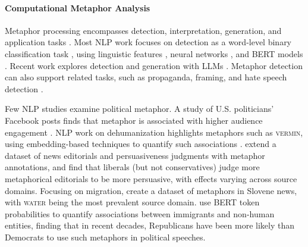 \paragraph{Computational Metaphor Analysis}

Metaphor processing encompasses detection, interpretation, generation, and application tasks \citep{shutova_models_2010,rai_survey_2020,ge_survey_2023,kohli_cracking_2023}. Most NLP work focuses on detection as a word-level binary classification task \citep{birke2006clustering,steen2010method,mohler2016introducing}, using linguistic features \citep{neuman_metaphor_2013,tsvetkov_metaphor_2014,jang_metaphor_2016}, neural networks \citep{gao_neural_2018,mao_end--end_2019,dankers_being_2020,le_multi-task_2020}, and BERT models  \citep{liu_metaphor_2020,choi_melbert_2021,lin_cate_2021,aghazadeh_metaphors_2022,babieno_miss_2022,li_framebert_2023,li_finding_2024}. Recent work explores detection and generation with LLMs \citep{dankin_can_2022,liu_testing_2022,joseph_newsmet_2023,lai_multilingual_2023,prystawski_psychologically-informed_2023,ichien_large_2024}. Metaphor detection can also support related tasks, such as propaganda, framing, and hate speech detection \citep{huguet_cabot_pragmatics_2020,lemmens_improving_2021,baleato_rodriguez_paper_2023}.



Few NLP studies examine political metaphor. A study of U.S. politicians' Facebook posts finds that metaphor is associated with higher audience engagement \citep{prabhakaran_how_2021}. NLP work on dehumanization highlights metaphors such as \textsc{vermin}, using embedding-based techniques to quantify such associations \citep{mendelsohn2020framework,engelmann_dataset_2024,zhang_beyond_2024}. \citet{sengupta-etal-2024-analyzing} extend a dataset of news editorials and persuasiveness judgments with metaphor annotations, and find that liberals (but not conservatives) judge more metaphorical editorials to be more persuasive, with effects varying across source domains. Focusing on migration, \citet{zwitter_vitez_extracting_2022} create a dataset of metaphors in Slovene news, with \textsc{water} being the most prevalent source domain. \citet{card2022computational} use BERT token probabilities to quantify associations between immigrants and non-human entities, finding that in recent decades, Republicans have been more likely than Democrats to use such metaphors in political speeches.


